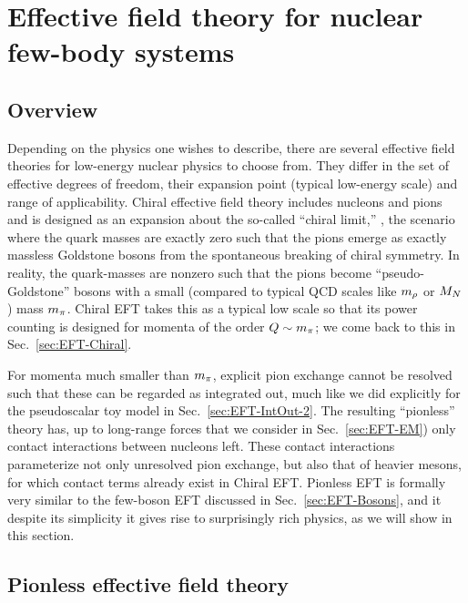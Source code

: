 %
\section{Effective field theory for nuclear few-body systems}
\label{sec:EFT-Nucleons}

\subsection{Overview}

Depending on the physics one wishes to describe, there are several effective 
field theories for low-energy nuclear physics to choose from.  They differ in 
the set of effective degrees of freedom, their expansion point (typical 
low-energy scale) and range of applicability.  Chiral effective field theory 
includes nucleons and pions and is designed as an expansion about the so-called 
``chiral limit,'' \ie, the scenario where the quark masses are exactly zero 
such that the pions emerge as exactly massless Goldstone bosons from the 
spontaneous breaking of chiral symmetry.  In reality, the quark-masses are 
nonzero such that the pions become ``pseudo-Goldstone'' bosons with a small 
(compared to typical QCD scales like $m_\rho$ or $M_N$) mass $m_\pi$.  Chiral EFT 
takes this as a typical low scale so that its power counting is designed for 
momenta of the order $Q\sim m_\pi$; we come back to this in 
Sec.~\ref{sec:EFT-Chiral}.

For momenta much smaller than $m_\pi$, explicit pion 
exchange cannot be resolved such that these can be regarded as integrated out, 
much like we did explicitly for the pseudoscalar toy model in 
Sec.~\ref{sec:EFT-IntOut-2}.  The resulting ``pionless'' theory has, up to 
long-range forces that we consider in Sec.~\ref{sec:EFT-EM}) only contact 
interactions between nucleons left.  These contact interactions parameterize not 
only unresolved pion exchange, but also that of heavier mesons, for which 
contact terms already exist in Chiral EFT.  Pionless EFT is formally very 
similar to the few-boson EFT discussed in Sec.~\ref{sec:EFT-Bosons}, and it 
despite its simplicity it gives rise to surprisingly rich physics, as we will 
show in this section.

\subsection{Pionless effective field theory}

